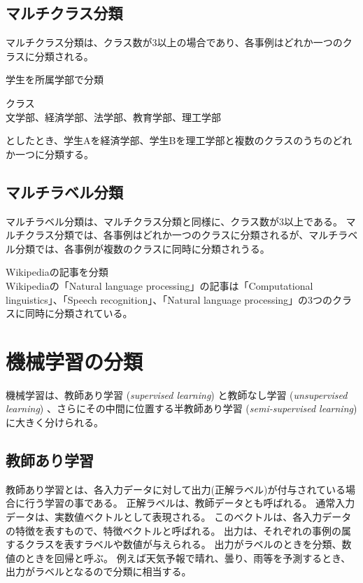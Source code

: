 \documentclass[titlepage,12pt]{jreport}
\def\ex{\noindent{{\bf 例}：}}
\begin{document}
\subsection{マルチクラス分類}
マルチクラス分類は、クラス数が3以上の場合であり、各事例はどれか一つのクラスに分類される。
\begin{description}
\item \ex 学生を所属学部で分類
\begin{description}
\item クラス\\
文学部、経済学部、法学部、教育学部、理工学部
\end{description}
としたとき、学生Aを経済学部、学生Bを理工学部と複数のクラスのうちのどれか一つに分類する。
\end{description}


\subsection{マルチラベル分類}
マルチラベル分類は、マルチクラス分類と同様に、クラス数が3以上である。 マルチクラス分類では、各事例はどれか一つのクラスに分類されるが、マルチラベル分類では、各事例が複数のクラスに同時に分類されうる。
\begin{description}
\item \ex Wikipediaの記事を分類\\
Wikipediaの「Natural language processing」の記事は「Computational linguistics」、「Speech recognition」、「Natural language processing」の3つのクラスに同時に分類されている。
\end{description}

\section{機械学習の分類\label{machine_learning}}
機械学習は、教師あり学習 ({\it supervised learning}) と教師なし学習 ({\it unsupervised learning}) 、さらにその中間に位置する半教師あり学習 ({\it semi-supervised learning}) に大きく分けられる。
\subsection{教師あり学習}
教師あり学習とは、各入力データに対して出力(正解ラベル)が付与されている場合に行う学習の事である。 正解ラベルは、教師データとも呼ばれる。 通常入力データは、実数値ベクトルとして表現される。 このベクトルは、各入力データの特徴を表すもので、特徴ベクトルと呼ばれる。 出力は、それぞれの事例の属するクラスを表すラベルや数値が与えられる。 出力がラベルのときを分類、数値のときを回帰と呼ぶ。 例えば天気予報で晴れ、曇り、雨等を予測するとき、出力がラベルとなるので分類に相当する。
\end{document}
